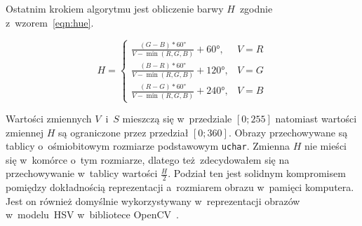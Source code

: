Ostatnim krokiem algorytmu jest obliczenie barwy $H$~zgodnie z~wzorem~\ref{eqn:hue}.

\begin{equation}
    \label{eqn:hue}
    H = \left\{ 
        \begin{array}{ll}
            \frac{(G - B) * 60\si{\degree}}{V - \min{(R, G, B)}} + 60\si{\degree}, & V = R \\
            \frac{(B - R) * 60\si{\degree}}{V - \min{(R, G, B)}} + 120\si{\degree}, & V = G \\
            \frac{(R - G) * 60\si{\degree}}{V - \min{(R, G, B)}} + 240\si{\degree}, & V = B
        \end{array} 
        \right.
\end{equation}
\smallskip

Wartości zmiennych $V$~i~$S$ mieszczą się w~przedziale $[0; 255]$ natomiast wartości zmiennej $H$ są ograniczone przez przedział $[0; 360]$. Obrazy przechowywane są tablicy o~ośmiobitowym rozmiarze podstawowym \texttt{uchar}. Zmienna $H$ nie mieści się w~komórce o~tym rozmiarze, dlatego też zdecydowałem się na przechowywanie w~tablicy wartości $\frac{H}{2}$. Podział ten jest solidnym kompromisem pomiędzy dokładnością reprezentacji a~rozmiarem obrazu w~pamięci komputera. Jest on również domyślnie wykorzystywany w~reprezentacji obrazów w~modelu~HSV w~bibliotece OpenCV~\cite{opencv}.